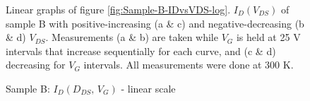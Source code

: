 \begin{figure}
\begin{centering}
{\begin{minipage}[t]{0.3\paperwidth}
\begin{flushright}
\par\end{flushright}%
\end{minipage}}\quad{}
\par\end{centering}
\caption{Sample B: $I_{D}\left(D_{DS},\,V_{G}\right)$ - linear scale\label{fig:Sample-B-IDvsVDS-linear}}

Linear graphs of figure \ref{fig:Sample-B-IDvsVDS-log}. $I_{D}\left(V_{DS}\right)$
of sample B with positive-increasing (a \& c) and negative-decreasing
(b \& d) $V_{DS}$. Measurements (a \& b) are taken while $V_{G}$
is held at 25 V intervals that increase sequentially for each curve,
and (c \& d) decreasing for $V_{G}$ intervals. All measurements were
done at 300 K.
\end{figure}

